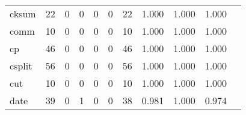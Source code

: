 \begin{longtable}{lp{1.20cm}p{1.20cm}p{1.20cm}p{1.20cm}p{1.20cm}p{1.20cm}p{1.20cm}p{1.20cm}p{1.20cm}p{1.20cm}}
cksum     &                                    22 &                                                  0 &                                                  0 &                                                  0 &                                                  0 &                                                 22 &                                         1.000 &                                              1.000 &                                              1.000 \\
comm      &                                    10 &                                                  0 &                                                  0 &                                                  0 &                                                  0 &                                                 10 &                                         1.000 &                                              1.000 &                                              1.000 \\
cp        &                                    46 &                                                  0 &                                                  0 &                                                  0 &                                                  0 &                                                 46 &                                         1.000 &                                              1.000 &                                              1.000 \\
csplit    &                                    56 &                                                  0 &                                                  0 &                                                  0 &                                                  0 &                                                 56 &                                         1.000 &                                              1.000 &                                              1.000 \\
cut       &                                    10 &                                                  0 &                                                  0 &                                                  0 &                                                  0 &                                                 10 &                                         1.000 &                                              1.000 &                                              1.000 \\
date      &                                    39 &                                                  0 &                                                  1 &                                                  0 &                                                  0 &                                                 38 &                                         0.981 &                                              1.000 &                                              0.974 \\

\end{longtable}
